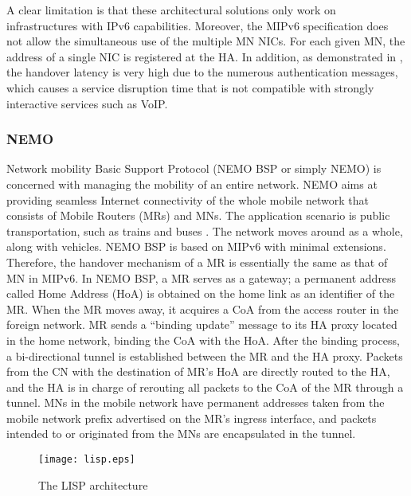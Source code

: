 \documentclass[preprint,12pt]{elsarticle}
\begin{document}
A clear limitation is that these architectural solutions only work on infrastructures 
with IPv6 capabilities. 
Moreover, the MIPv6 specification does not allow the simultaneous use of the 
multiple MN NICs. 
For each given MN, the address of a single NIC is registered at the \ac{HA}. In 
addition, as demonstrated in \cite{kong}, the handover latency is very high 
due to the numerous authentication messages, which causes a service disruption 
time that is not compatible with strongly interactive services such as VoIP. 

\subsubsection{NEMO}
Network mobility Basic Support Protocol (NEMO BSP or simply NEMO) 
is concerned with managing the mobility of an entire network. NEMO 
aims at providing seamless Internet connectivity of the whole mobile network 
that consists of Mobile Routers (MRs) and \acp{MN}. 
The application scenario is public transportation, such as trains and buses 
\cite{Perera:2004}. The network moves around as a whole, along with vehicles. 
NEMO BSP is based on MIPv6 with minimal extensions. Therefore, the handover 
mechanism of a MR is essentially the same as that of MN in MIPv6. 
In NEMO BSP, a MR serves as a gateway; a permanent address called Home Address 
(HoA) is obtained on the home link as an identifier of the MR. When the MR moves away, 
it acquires a \ac{CoA} from the access router in the foreign network. MR 
sends a ``binding update'' message to its \ac{HA} proxy located in the home 
network, binding the \ac{CoA} with the HoA. 
After the binding process, a bi-directional tunnel is established between the MR 
and the HA proxy. Packets from the CN with the destination of MR’s HoA are 
directly routed to the HA, and the HA is in charge of rerouting all packets to 
the \ac{CoA} of the MR through a tunnel. 
MNs in the mobile network have permanent addresses taken from the mobile 
network prefix advertised on the MR’s ingress interface, and packets intended 
to or originated from the MNs are encapsulated in the tunnel. 


\begin{figure}[h]
   \centering
   \texttt{[image: lisp.eps]}
   \caption{The LISP architecture \cite{lisp}}
   \label{fig:lisp}
\end{figure}
\end{document}
